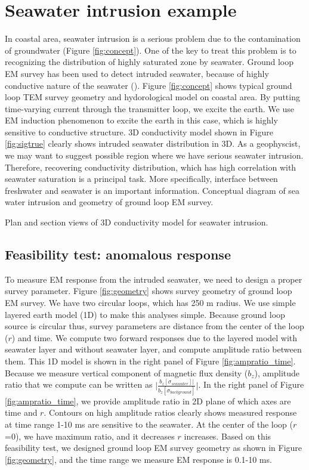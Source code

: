 \documentclass{segabs}
\begin{document}
\section*{Seawater intrusion example}
In coastal area, seawater intrusion is a serious problem due to the contamination of groundwater (Figure \ref{fig:concept}). One of the key to treat this problem is to recognizing the distribution of highly saturated zone by seawater. Ground loop EM survey has been used to detect intruded seawater, because of highly conductive nature of the seawater (\cite{Mills1988}). Figure \ref{fig:concept} shows typical ground loop TEM survey geometry and hydorological model on coastal area. By putting time-varying current through the transmitter loop, we excite the earth. We use EM induction phenomenon to excite the earth in this case, which is highly sensitive to conductive structure. 3D conductivity model shown in Figure \ref{fig:sigtrue} clearly shows intruded seawater distribution in 3D. As a geophyscist, we may want to suggest possible region where we have serious seawater intrusion. Therefore, recovering conductivity distribution, which has high correlation with seawater saturation is a principal task. More specifically, interface between freshwater and seawater is an important information. 
{Conceptual diagram of sea water intrusion and geometry of ground loop EM survey.}

{Plan and section views of 3D conductivity model for seawater intrusion.}

\subsection*{Feasibility test: anomalous response}
To measure EM response from the intruded seawater, we need to design a proper survey parameter. Figure \ref{fig:geometry} shows survey geometry of ground loop EM survey. We have two circular loops, which has 250 m radius. We use simple layered earth model (1D) to make this analyses simple. Because ground loop source is circular thus, survey parameters are distance from the center of the loop ($r$) and time. We compute two forward responses due to the layered model with seawater layer and without seawater layer, and compute amplitude ratio between them. This 1D model is shown in the right panel of Figure \ref{fig:ampratio_time}. Because we measure vertical component of magnetic flux density ($b_z$), amplitude ratio that we compute can be written as $\Big|\frac{b_z[\sigma_{seawater}]|}{b_z[\sigma_{background}]}\Big|$. In the right panel of Figure \ref{fig:ampratio_time}, we provide amplitude ratio in 2D plane of which axes are time and $r$. Contours on high amplitude ratios clearly shows measured response at time range 1-10 ms are sensitive to the seawater. At the center of the loop ($r$=0), we have maximum ratio, and it decreases $r$ increases. Based on this feasibility test, we designed ground loop EM survey geometry as shown in Figure \ref{fig:geometry}, and the time range we measure EM response is 0.1-10 ms.
\end{document}
